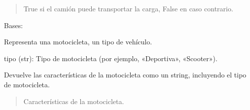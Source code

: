 \documentclass[letterpaper,10pt,spanish]{sphinxmanual}
\begin{document}
\begin{fulllineitems}
\begin{fulllineitems}
\begin{quote}
\begin{description}
\sphinxAtStartPar
True si el camión puede transportar la carga, False en caso contrario.

\end{description}\end{quote}

\end{fulllineitems}


\end{fulllineitems}


\begin{fulllineitems}
\label{\detokenize{pr8:pr8.4.Motocicleta}}
\pysigstartsignatures
{}
\pysigstopsignatures
\sphinxAtStartPar
Bases: {\hyperref[\detokenize{pr8:pr8.4.Vehiculo}]{}}

\sphinxAtStartPar
Representa una motocicleta, un tipo de vehículo.
\begin{description}
\sphinxAtStartPar
tipo (str): Tipo de motocicleta (por ejemplo, «Deportiva», «Scooter»).

\end{description}

\begin{fulllineitems}
\label{\detokenize{pr8:pr8.4.Motocicleta.caracteristicas}}
\pysigstartsignatures
{}
\pysigstopsignatures
\sphinxAtStartPar
Devuelve las características de la motocicleta como un string, incluyendo el tipo de motocicleta.
\begin{quote}\begin{description}
\sphinxAtStartPar
Características de la motocicleta.

\end{description}\end{quote}

\end{fulllineitems}


\end{fulllineitems}
\end{document}
